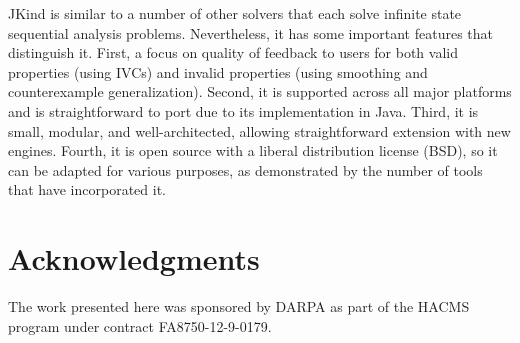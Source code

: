 \documentclass{llncs}
\newcommand{\jkind}{{\sc JKind}\xspace}
\renewcommand{\paragraph}[1]{\vspace{5pt}\noindent {\bf #1}}
\begin{document}
\paragraph{Conclusion}
\jkind is similar to a number of other solvers that each solve
infinite state sequential analysis problems. Nevertheless, it has some
important features that distinguish it. First, a focus on quality of
feedback to users for both valid properties (using IVCs) and invalid
properties (using smoothing and counterexample generalization).
Second, it is supported across all major platforms and is
straightforward to port due to its implementation in Java. Third, it
is small, modular, and well-architected, allowing straightforward
extension with new engines. Fourth, it is open source with a liberal
distribution license (BSD), so it can be adapted for various purposes,
as demonstrated by the number of tools that have incorporated it.

\section{Acknowledgments}

The work presented here was sponsored by DARPA as part of the HACMS
program under contract FA8750-12-9-0179.

{}

\end{document}

